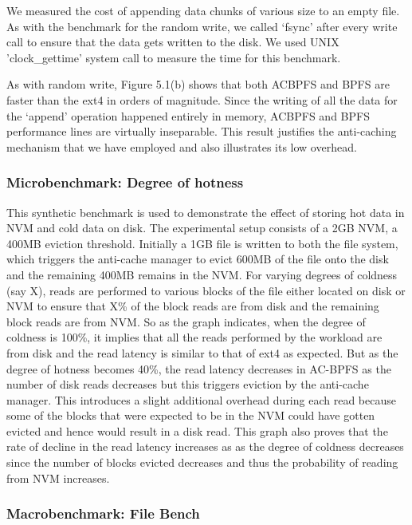 We measured the cost of appending data chunks of various size to an empty file. As with the benchmark for the random write, we called ‘fsync’ after every write call to ensure that the data gets written to the disk. We used UNIX 'clock\_gettime' system call to measure the time for this benchmark.

As with random write, Figure 5.1(b) shows that both AC\-BPFS and BPFS are faster than the ext4 in orders of magnitude. Since the writing of all the data for the ‘append’ operation happened entirely in memory, AC\-BPFS and BPFS performance lines are virtually inseparable. This result justifies the anti-caching mechanism that we have employed and also illustrates its low overhead.


\subsubsection{Microbenchmark: Degree of hotness}

This synthetic benchmark is used to demonstrate the effect of storing hot data in NVM and cold data on disk. The experimental setup consists of a 2GB NVM, a 400MB eviction threshold. Initially a 1GB file is written to both the file system, which triggers the anti-cache manager to evict 600MB of the file onto the disk and the remaining 400MB remains in the NVM. For varying degrees of coldness (say X), reads are performed to various blocks of the file either located on disk or NVM to ensure that X\% of the block reads are from disk and the remaining block reads are from NVM. So as the graph indicates, when the degree of coldness is 100\%, it implies that all the reads performed by the workload are from disk and the read latency is similar to that of ext4 as expected. But as the degree of hotness becomes 40\%, the read latency decreases in AC-BPFS as the number of disk reads decreases but this triggers eviction by the anti-cache manager. This introduces a slight additional overhead during each read because some of the blocks that were expected to be in the NVM could have gotten evicted and hence would result in a disk read. This graph also proves that the rate of decline in the read latency increases as as the degree of coldness decreases since the number of blocks evicted decreases and thus the probability of reading from NVM increases.


 
\subsubsection{Macrobenchmark: File Bench}

